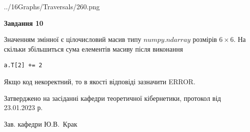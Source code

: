 \documentclass[12pt, ukrainian]{article}
\begin{document}
{\begin {large}
\begin{center}
	{../16Graphs/Traversals/260.png}
\end{center}\par
\newpage

{\begin {center}\textbf{Завдання 10}\end {center}}\par
Значенням змінної  є цілочисловий масив типу $numpy.ndarray$ розмірів $6{\times}6$. На скільки збільшиться сума елементів масиву  після виконання
\begin{verbatim}
a.T[2] += 2
\end{verbatim}


Якщо код некоректний, то в якості відповіді зазначити ERROR.\par
\newpage


\end {large}
}
{\smallskip \begin {small} Затверджено на засіданні кафедри теоретичної кібернетики, протокол  від   23.01.2023 р.\par\smallskip\smallskip
{\parbox {6.5 cm}{Зав. кафедри \dotfill Ю.В.~Крак}} \end{small}}
\end{document}
